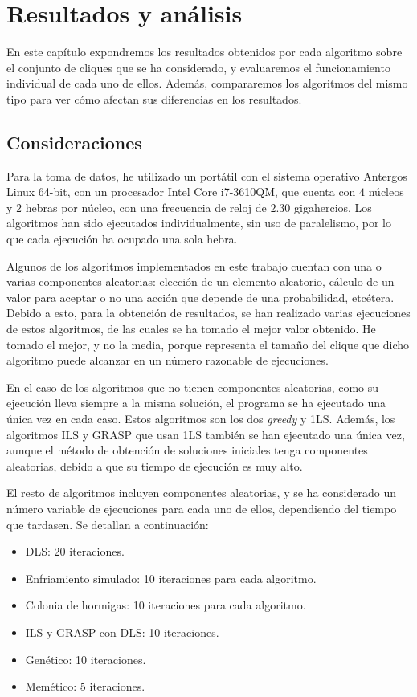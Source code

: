 \chapter{Resultados y análisis}\label{ch:resultados}

En este capítulo expondremos los resultados obtenidos por cada algoritmo sobre el
conjunto de cliques que se ha considerado, y evaluaremos el funcionamiento individual
de cada uno de ellos. Además, compararemos los algoritmos del mismo tipo para ver cómo
afectan sus diferencias en los resultados.

\section{Consideraciones}

Para la toma de datos, he utilizado un portátil con el sistema operativo Antergos
Linux 64-bit, con un procesador Intel Core i7-3610QM, que cuenta con $4$ núcleos
y $2$ hebras por núcleo, con una frecuencia de reloj de $2.30$ gigahercios. Los
algoritmos han sido ejecutados individualmente, sin uso de paralelismo, por lo que
cada ejecución ha ocupado una sola hebra.

Algunos de los algoritmos implementados en este trabajo cuentan con una o varias
componentes aleatorias: elección de un elemento aleatorio, cálculo de un valor para
aceptar o no una acción que depende de una probabilidad, etcétera. Debido a esto,
para la obtención de resultados, se han realizado varias ejecuciones de estos algoritmos,
de las cuales se ha tomado el mejor valor obtenido. He tomado el mejor, y no la media,
porque representa el tamaño del clique que dicho algoritmo puede alcanzar en un
número razonable de ejecuciones.

En el caso de los algoritmos que no tienen componentes aleatorias, como su ejecución
lleva siempre a la misma solución, el programa se ha ejecutado una única vez en
cada caso. Estos algoritmos son los dos \textit{greedy} y 1LS. Además, los algoritmos
ILS y GRASP que usan 1LS también se han ejecutado una única vez, aunque el método
de obtención de soluciones iniciales tenga componentes aleatorias, debido a que su
tiempo de ejecución es muy alto.

El resto de algoritmos incluyen componentes aleatorias, y se ha considerado un
número variable de ejecuciones para cada uno de ellos, dependiendo del tiempo que
tardasen. Se detallan a continuación:
\begin{itemize}
  \item DLS: 20 iteraciones.
  \item Enfriamiento simulado: 10 iteraciones para cada algoritmo.
  \item Colonia de hormigas: 10 iteraciones para cada algoritmo.
  \item ILS y GRASP con DLS: 10 iteraciones.
  \item Genético: 10 iteraciones.
  \item Memético: 5 iteraciones.
\end{itemize}


